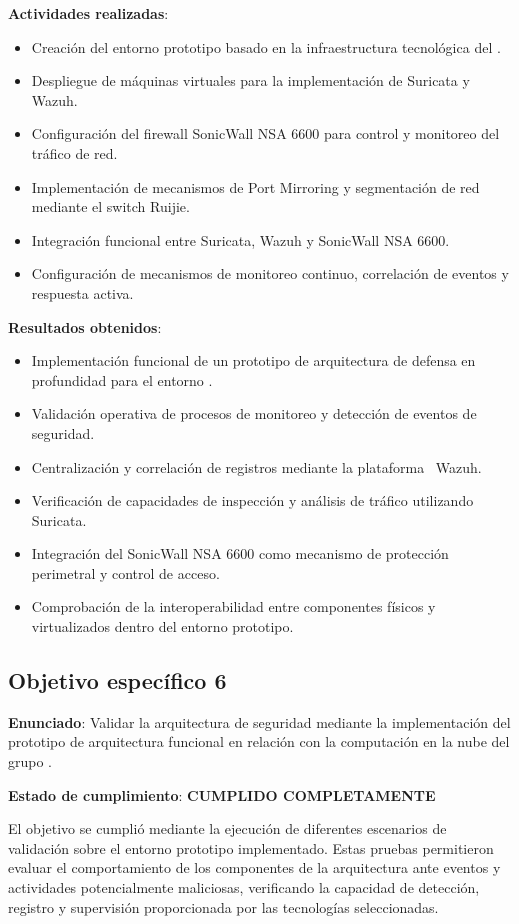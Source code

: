 \textbf{Actividades realizadas}:
\begin{itemize}
	\item Creación del entorno prototipo basado en la infraestructura tecnológica del \GRID.
	\item Despliegue de máquinas virtuales para la implementación de Suricata y Wazuh.
	\item Configuración del firewall SonicWall NSA 6600 para control y monitoreo del tráfico de red.
	\item Implementación de mecanismos de Port Mirroring y segmentación de red mediante el switch Ruijie.
	\item Integración funcional entre Suricata, Wazuh y SonicWall NSA 6600.
	\item Configuración de mecanismos de monitoreo continuo, correlación de eventos y respuesta activa.
\end{itemize}

\textbf{Resultados obtenidos}:
\begin{itemize}
	\item Implementación funcional de un prototipo de arquitectura de defensa en profundidad para el entorno \GRID.
	\item Validación operativa de procesos de monitoreo y detección de eventos de seguridad.
	\item Centralización y correlación de registros mediante la plataforma \SIEM\ Wazuh.
	\item Verificación de capacidades de inspección y análisis de tráfico utilizando Suricata.
	\item Integración del SonicWall NSA 6600 como mecanismo de protección perimetral y control de acceso.
	\item Comprobación de la interoperabilidad entre componentes físicos y virtualizados dentro del entorno prototipo.
\end{itemize}

\subsection{Objetivo específico 6}
\noindent

\textbf{Enunciado}: Validar la arquitectura de seguridad mediante la implementación del prototipo de arquitectura funcional en relación 
con la computación en la nube del grupo \GRID.

\textbf{Estado de cumplimiento}: \textbf{CUMPLIDO COMPLETAMENTE}

El objetivo se cumplió mediante la ejecución de diferentes escenarios de validación sobre el entorno prototipo implementado. 
Estas pruebas permitieron evaluar el comportamiento de los componentes de la arquitectura ante eventos y actividades 
potencialmente maliciosas, verificando la capacidad de detección, registro y supervisión proporcionada por las tecnologías 
seleccionadas.


